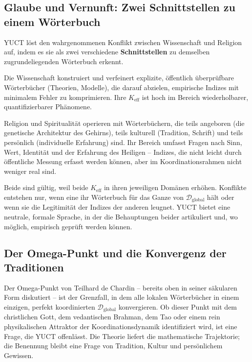 \documentclass[12pt,a4paper]{article}
\begin{document}
	\subsection{Glaube und Vernunft: Zwei Schnittstellen zu einem Wörterbuch}
	
	YUCT löst den wahrgenommenen Konflikt zwischen Wissenschaft und Religion auf, indem es sie als zwei verschiedene \textbf{Schnittstellen} zu demselben zugrundeliegenden Wörterbuch erkennt.
	
	Die Wissenschaft konstruiert und verfeinert explizite, öffentlich überprüfbare Wörterbücher (Theorien, Modelle), die darauf abzielen, empirische Indizes mit minimalem Fehler zu komprimieren. Ihre \(K_{\mathrm{eff}}\) ist hoch im Bereich wiederholbarer, quantifizierbarer Phänomene.
	
	Religion und Spiritualität operieren mit Wörterbüchern, die teils angeboren (die genetische Architektur des Gehirns), teils kulturell (Tradition, Schrift) und teils persönlich (individuelle Erfahrung) sind. Ihr Bereich umfasst Fragen nach Sinn, Wert, Identität und der Erfahrung des Heiligen – Indizes, die nicht leicht durch öffentliche Messung erfasst werden können, aber im Koordinationsrahmen nicht weniger real sind.
	
	Beide sind gültig, weil beide \(K_{\mathrm{eff}}\) in ihren jeweiligen Domänen erhöhen. Konflikte entstehen nur, wenn eine ihr Wörterbuch für das Ganze von \(\mathcal{D}_{\text{global}}\) hält oder wenn sie die Legitimität der Indizes der anderen leugnet. YUCT bietet eine neutrale, formale Sprache, in der die Behauptungen beider artikuliert und, wo möglich, empirisch geprüft werden können.
	
	\subsection{Der Omega-Punkt und die Konvergenz der Traditionen}
	
	Der Omega-Punkt von Teilhard de Chardin – bereits oben in seiner säkularen Form diskutiert – ist der Grenzfall, in dem alle lokalen Wörterbücher in einem einzigen, perfekt koordinierten \(\mathcal{D}_{\text{global}}\) konvergieren. Ob dieser Punkt mit dem christlichen Gott, dem vedantischen Brahman, dem Tao oder einem rein physikalischen Attraktor der Koordinationsdynamik identifiziert wird, ist eine Frage, die YUCT offenlässt. Die Theorie liefert die mathematische Trajektorie; die Benennung bleibt eine Frage von Tradition, Kultur und persönlichem Gewissen.
	
\end{document}
